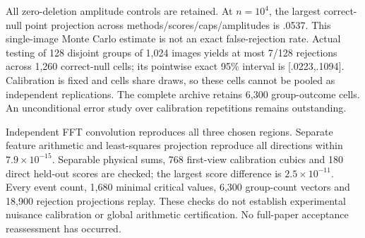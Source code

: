 All zero-deletion amplitude controls are retained. At $n=10^4$, the largest
correct-null point projection across methods/scores/caps/amplitudes is .0537.
This single-image Monte Carlo estimate is not an exact false-rejection rate.
Actual testing of 128 disjoint groups of 1,024 images yields at most 7/128
rejections across 1,260 correct-null cells; its pointwise exact 95\% interval
is [.0223,.1094]. Calibration is fixed and cells share draws, so these cells
cannot be pooled as independent replications. The complete archive retains
6,300 group-outcome cells. An unconditional error study over calibration
repetitions remains outstanding.

Independent FFT convolution reproduces all three chosen regions. Separate
feature arithmetic and least-squares projection reproduce all directions within
$7.9\times10^{-15}$. Separable physical sums, 768 first-view calibration
cubics and 180 direct held-out scores are checked; the largest score difference
is $2.5\times10^{-11}$. Every event count, 1,680 minimal critical values,
6,300 group-count vectors and 18,900 rejection projections replay. These
checks do not establish experimental nuisance calibration or global arithmetic
certification. No full-paper acceptance reassessment has occurred.


